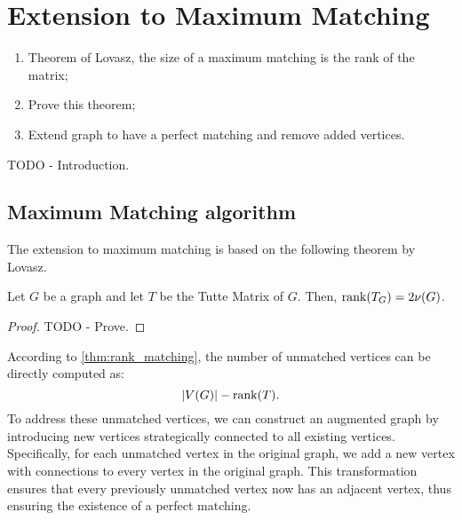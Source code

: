 \chapter{Extension to Maximum Matching}
\label{chap:maximum_matching}
\begin{enumerate}
    \item Theorem of Lovasz, the size of a maximum matching is the rank of the matrix;
    \item Prove this theorem;
    \item Extend graph to have a perfect matching and remove added vertices.
\end{enumerate}

TODO - Introduction.

\section{Maximum Matching algorithm}

The extension to maximum matching is based on the following theorem by Lovasz.
\begin{theorem}
\label{thm:rank_matching}
    Let \(G\) be a graph and let \(T\) be the Tutte Matrix of \(G\).
    Then, \(\operatorname{rank}(T_G) = 2\nu(G)\).
\end{theorem}

\begin{proof}
TODO - Prove.
\end{proof}

According to \cref{thm:rank_matching}, the number of unmatched vertices can be directly computed as:
\[
    |V(G)| - \operatorname{rank}(T).
\]
To address these unmatched vertices, we can construct an augmented graph by introducing new vertices strategically connected to all existing vertices. 
Specifically, for each unmatched vertex in the original graph, we add a new vertex with connections to every vertex in the original graph. 
This transformation ensures that every previously unmatched vertex now has an adjacent vertex, thus ensuring the existence of a perfect matching.

